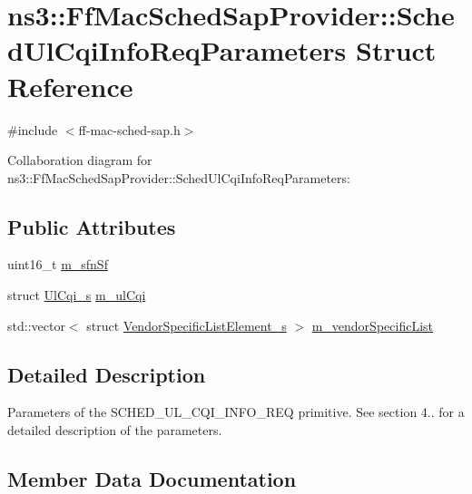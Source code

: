 \hypertarget{structns3_1_1FfMacSchedSapProvider_1_1SchedUlCqiInfoReqParameters}{}\section{ns3\+:\+:Ff\+Mac\+Sched\+Sap\+Provider\+:\+:Sched\+Ul\+Cqi\+Info\+Req\+Parameters Struct Reference}
\label{structns3_1_1FfMacSchedSapProvider_1_1SchedUlCqiInfoReqParameters}


{\ttfamily \#include $<$ff-\/mac-\/sched-\/sap.\+h$>$}



Collaboration diagram for ns3\+:\+:Ff\+Mac\+Sched\+Sap\+Provider\+:\+:Sched\+Ul\+Cqi\+Info\+Req\+Parameters\+:
\subsection*{Public Attributes}
\begin{DoxyCompactItemize}
\item 
uint16\+\_\+t \hyperlink{structns3_1_1FfMacSchedSapProvider_1_1SchedUlCqiInfoReqParameters_a03a5f4fe9abf48adf9428548bf11fac6}{m\+\_\+sfn\+Sf}
\item 
struct \hyperlink{structns3_1_1UlCqi__s}{Ul\+Cqi\+\_\+s} \hyperlink{structns3_1_1FfMacSchedSapProvider_1_1SchedUlCqiInfoReqParameters_aef7a2eb9e8ee13b6032d708e55b60510}{m\+\_\+ul\+Cqi}
\item 
std\+::vector$<$ struct \hyperlink{structns3_1_1VendorSpecificListElement__s}{Vendor\+Specific\+List\+Element\+\_\+s} $>$ \hyperlink{structns3_1_1FfMacSchedSapProvider_1_1SchedUlCqiInfoReqParameters_a651e5be52736f332650ce53566a00727}{m\+\_\+vendor\+Specific\+List}
\end{DoxyCompactItemize}


\subsection{Detailed Description}
Parameters of the S\+C\+H\+E\+D\+\_\+\+U\+L\+\_\+\+C\+Q\+I\+\_\+\+I\+N\+F\+O\+\_\+\+R\+EQ primitive. See section 4.. for a detailed description of the parameters. 

\subsection{Member Data Documentation}
